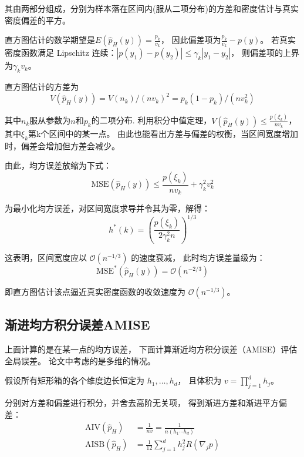 \documentclass[UTF8]{ctexart}
\begin{document}
其由两部分组成，分别为样本落在区间内(服从二项分布)的方差和密度估计与真实密度偏差的平方。

直方图估计的数学期望是$E(\hat{p}_H(y)) = \frac{p_k}{v_k}$，
因此偏差项为$\frac{p_k}{v_k} - p(y)$。
若真实密度函数满足 Lipschitz 连续：$|p(y_1) - p(y_2)| \le \gamma_k |y_1 - y_2|$，
则偏差项的上界为$ \gamma_k v_k$。

直方图估计的方差为
\begin{equation}
    V(\hat{p}_H(y)) = V(n_k) / (n v_k)^2 = p_k(1-p_k) / (n v_k^2)
\end{equation}

其中$n_k$服从参数为$n$和$p_k$的二项分布.
利用积分中值定理，$V(\hat{p}_H(y)) \le \frac{p(\xi_k)}{nv_k}$，
其中$\xi_k$第k个区间中的某一点。
由此也能看出方差与偏差的权衡，当区间宽度增加时，偏差会增加但方差会减少。

由此，均方误差放缩为下式：
\begin{equation}
\text{MSE}(\hat{p}_H(y)) \le \frac{p(\xi_k)}{nv_k} + \gamma_k^2 v_k^2
\end{equation}

为最小化均方误差，对区间宽度求导并令其为零，解得：
\begin{equation}
h^*(k) = \left( \frac{p(\xi_k)}{2\gamma_k^2 n} \right)^{1/3}
\end{equation}

这表明，区间宽度应以 $\mathcal{O}(n^{-1/3})$ 的速度衰减，
此时均方误差量级为：
\begin{equation}
\text{MSE}^*(\hat{p}_H(y)) = \mathcal{O}(n^{-2/3})
\end{equation}

即直方图估计该点逼近真实密度函数的收敛速度为 $\mathcal{O}(n^{-1/3})$。

\subsection{渐进均方积分误差AMISE}

上面计算的是在某一点的均方误差，
下面计算渐近均方积分误差（AMISE）评估全局误差。
论文中考虑的是多维的情况。

假设所有矩形箱的各个维度边长恒定为 $h_1, \dots, h_d$，
且体积为 $v = \prod_{j=1}^d h_j$。

分别对方差和偏差进行积分，并舍去高阶无关项，
得到渐进方差和渐进平方偏差：
\begin{align}
\text{AIV}(\hat{p}_H) &= \frac{1}{nv} = \frac{1}{n(h_1 \cdots h_d)} \\
\text{AISB}(\hat{p}_H) &= \frac{1}{12} \sum_{j=1}^d h_j^2 R(\nabla_j p)
\end{align}
\end{document}
